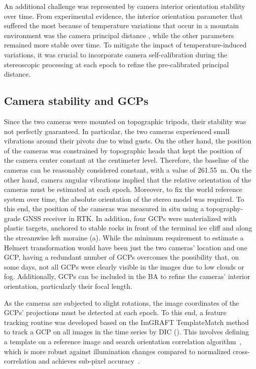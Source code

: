 An additional challenge was represented by camera interior orientation stability over time.
From experimental evidence, the interior orientation parameter that suffered the most because of temperature variations that occur in a mountain environment was the camera principal distance \citep{Elias2020}, while the other parameters remained more stable over time.
To mitigate the impact of temperature-induced variations, it was crucial to incorporate camera self-calibration during the stereoscopic processing at each epoch to refine the pre-calibrated principal distance.

\subsection{Camera stability and GCPs}\label{sec:4:stability}

Since the two cameras were mounted on topographic tripods, their stability was not perfectly guaranteed. In particular, the two cameras experienced small vibrations around their pivots due to wind gusts.
On the other hand, the position of the cameras was constrained by topographic heads that kept the position of the camera center constant at the centimeter level.
Therefore, the baseline of the cameras can be reasonably considered constant, with a value of \SI{261.55}{\meter}.
On the other hand, camera angular vibrations implied that the relative orientation of the cameras must be estimated at each epoch.
Moreover, to fix the world reference system over time, the absolute orientation of the stereo model was required.
To this end, the position of the cameras was measured in situ using a topography-grade GNSS receiver in RTK.
In addition, four GCPs were materialized with plastic targets, anchored to stable rocks in front of the terminal ice cliff and along the streamwise left moraine (a).
While the minimum requirement to estimate a Helmert transformation would have been just the two cameras' location and one GCP, having a redundant number of GCPs overcomes the possibility that, on some days, not all GCPs were clearly visible in the images due to low clouds or fog.
Additionally, GCPs can be included in the BA to refine the cameras' interior orientation, particularly their focal length.

As the cameras are subjected to slight rotations, the image coordinates of the GCPs' projections must be detected at each epoch.
To this end, a feature tracking routine was developed based on the ImGRAFT TemplateMatch method~\citep{Messerli2015} to track a GCP on all images in the time series by DIC (). 
This involves defining a template on a reference image and search orientation correlation algorithm~\citep{fitch2002_OC}, which is more robust against illumination changes compared to normalized cross-correlation and achieves sub-pixel accuracy~\citep{Dematteis2021, Heid2012_evaluation_xcorr}.

